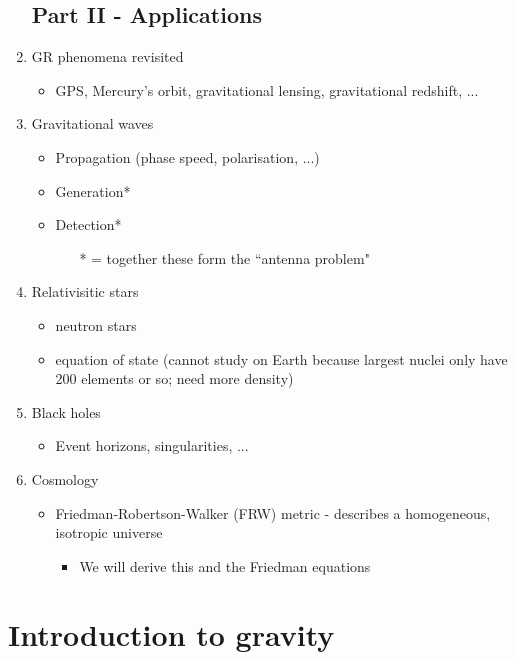 \documentclass[a4paper]{article} %
\begin{document}
\begin{enumerate}
\subsection{Part II - Applications}
\item GR phenomena revisited 
\begin{itemize}
\item GPS, Mercury's orbit, gravitational lensing, gravitational redshift, ...
\end{itemize}
\item Gravitational waves
\begin{itemize}
\item Propagation (phase speed, polarisation, ...)
\item Generation*
\item Detection*
\begin{itemize}
\item[*] = together these form the ``antenna problem"
\end{itemize}
\end{itemize}
\item Relativisitic stars
\begin{itemize}
\item neutron stars
\item equation of state (cannot study on Earth because largest nuclei only have 200 elements or so; need more density)
\end{itemize}
\item Black holes
\begin{itemize}
\item Event horizons, singularities, ...
\end{itemize}
\item Cosmology
\begin{itemize}
\item Friedman-Robertson-Walker (FRW) metric - describes a homogeneous, isotropic universe
\begin{itemize}
\item We will derive this and the Friedman equations
\end{itemize}
\end{itemize}

\end{enumerate}


\section{Introduction to gravity}
\end{document}
